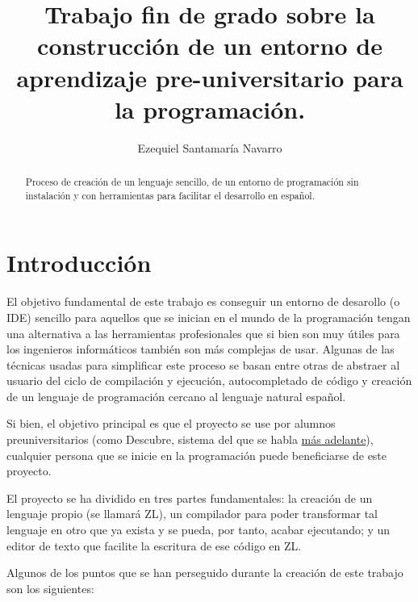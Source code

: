 \documentclass{report}
\author{Ezequiel Santamaría Navarro}
\title{Trabajo fin de grado sobre la construcción de un entorno de aprendizaje pre-universitario para la programación.}
\begin{document}
	\maketitle
	\tableofcontents
	
	\begin{abstract}
		Proceso de creación de un lenguaje sencillo, de un entorno de programación sin instalación y con herramientas para facilitar el desarrollo en español.
	\end{abstract}
	
	
	\chapter{Introducción}
	
	El objetivo fundamental de este trabajo es conseguir un entorno de desarollo (o IDE) sencillo para aquellos que se inician en el mundo de la programación tengan una alternativa a las herramientas profesionales que si bien son muy útiles para los ingenieros informáticos también son más complejas de usar. Algunas de las técnicas usadas para simplificar este proceso se basan entre otras de abstraer al usuario del ciclo de compilación y ejecución, autocompletado de código y creación de un lenguaje de programación cercano al lenguaje natural español. 
	
	\vspace{10px}
	
	Si bien, el objetivo principal es que el proyecto se use por alumnos preuniversitarios (como Descubre, sistema del que se habla \hyperref[descubre]{más adelante}), cualquier persona que se inicie en la programación puede beneficiarse de este proyecto.
	
	\vspace{10px}
	
	El proyecto se ha dividido en tres partes fundamentales: la creación de un lenguaje propio (se llamará ZL), un compilador para poder transformar tal lenguaje en otro que ya exista y se pueda, por tanto, acabar ejecutando; y un editor de texto que facilite la escritura de ese código en ZL.

	\vspace{10px}

	Algunos de los puntos que se han perseguido durante la creación de este trabajo son los siguientes:
	
\end{document}
